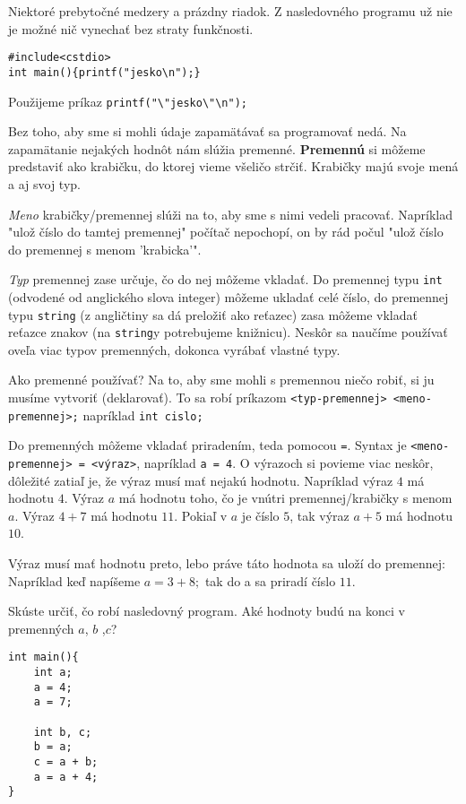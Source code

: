 \riesenie Niektoré prebytočné medzery a prázdny riadok. Z nasledovného
programu už nie je možné nič vynechať bez straty funkčnosti.
\begin{lstlisting}
#include<cstdio>
int main(){printf("jesko\n");}
\end{lstlisting}

\riesenie Použijeme príkaz \verb!printf("\"jesko\"\n");!

Bez toho, aby sme si mohli údaje zapamätávať sa programovať nedá. Na zapamätanie
nejakých hodnôt nám slúžia premenné. \textbf{Premennú} si môžeme predstaviť ako
krabičku, do ktorej vieme všeličo strčiť. Krabičky majú svoje mená a aj svoj
typ. 

\emph{Meno} krabičky/premennej slúži na to, aby sme s nimi vedeli pracovať.
Napríklad "ulož číslo do tamtej premennej" počítač nepochopí, on by rád počul
"ulož číslo do premennej s menom 'krabicka'". 

\emph{Typ} premennej zase určuje, čo do nej môžeme vkladať. Do premennej typu
\verb!int! (odvodené od anglického slova integer) môžeme ukladať celé číslo, do
premennej typu \verb!string! (z angličtiny sa dá preložiť ako reťazec) zasa môžeme vkladať reťazce
znakov (na \verb!string!y potrebujeme knižnicu). Neskôr sa naučíme používať
oveľa viac typov premenných, dokonca vyrábať vlastné typy.

\medskip

Ako premenné používať? Na to, aby sme mohli s premennou niečo robiť, si
ju musíme vytvoriť (deklarovať). To sa robí príkazom \verb!<typ-premennej> <meno-premennej>;!
napríklad \verb!int cislo;! 

Do premenných môžeme vkladať priradením, teda pomocou \verb'='. Syntax je
\verb!<meno-premennej> = <výraz>!, napríklad \verb!a = 4!. O výrazoch si
povieme viac neskôr, dôležité zatiaľ je, že výraz musí mať nejakú hodnotu.
Napríklad výraz $4$ má hodnotu $4$. Výraz $a$ má hodnotu toho, čo je vnútri
premennej/krabičky s menom $a$.  Výraz $4 + 7$ má hodnotu $11$. Pokiaľ v $a$ je
číslo $5$, tak výraz $a + 5$ má hodnotu $10$.

Výraz musí mať hodnotu preto, lebo práve táto hodnota sa uloží do premennej:
Napríklad keď napíšeme $a = 3 + 8;$ tak do a sa priradí číslo $11$.

\cvicenie Skúste určiť, čo robí nasledovný program. Aké hodnoty budú na
konci v premenných $a$, $b$ ,$c$?
\begin{lstlisting}
int main(){
    int a;
    a = 4;
    a = 7;

    int b, c;
    b = a;
    c = a + b;
    a = a + 4;
}
\end{lstlisting}


